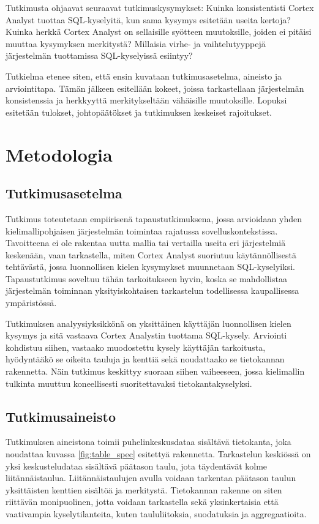 Tutkimusta ohjaavat seuraavat tutkimuskysymykset: Kuinka konsistentisti Cortex Analyst tuottaa SQL-kyselyitä, kun sama kysymys esitetään useita kertoja? Kuinka herkkä Cortex Analyst on sellaisille syötteen muutoksille, joiden ei pitäisi muuttaa kysymyksen merkitystä? Millaisia virhe- ja vaihtelutyyppejä järjestelmän tuottamissa SQL-kyselyissä esiintyy?

Tutkielma etenee siten, että ensin kuvataan tutkimusasetelma, aineisto ja arviointitapa. Tämän jälkeen esitellään kokeet, joissa tarkastellaan järjestelmän konsistenssia ja herkkyyttä merkitykseltään vähäisille muutoksille. Lopuksi esitetään tulokset, johtopäätökset ja tutkimuksen keskeiset rajoitukset.

\section{Metodologia}

\subsection{Tutkimusasetelma}
Tutkimus toteutetaan empiirisenä tapaustutkimuksena, jossa arvioidaan yhden kielimallipohjaisen järjestelmän toimintaa rajatussa sovelluskontekstissa. Tavoitteena ei ole rakentaa uutta mallia tai vertailla useita eri järjestelmiä keskenään, vaan tarkastella, miten Cortex Analyst suoriutuu käytännöllisestä tehtävästä, jossa luonnollisen kielen kysymykset muunnetaan SQL-kyselyiksi. Tapaustutkimus soveltuu tähän tarkoitukseen hyvin, koska se mahdollistaa järjestelmän toiminnan yksityiskohtaisen tarkastelun todellisessa kaupallisessa ympäristössä.

Tutkimuksen analyysiyksikkönä on yksittäinen käyttäjän luonnollisen kielen kysymys ja sitä vastaava Cortex Analystin tuottama SQL-kysely. Arviointi kohdistuu siihen, vastaako muodostettu kysely käyttäjän tarkoitusta, hyödyntääkö se oikeita tauluja ja kenttiä sekä noudattaako se tietokannan rakennetta. Näin tutkimus keskittyy suoraan siihen vaiheeseen, jossa kielimallin tulkinta muuttuu koneellisesti suoritettavaksi tietokantakyselyksi.

\subsection{Tutkimusaineisto}
Tutkimuksen aineistona toimii puhelinkeskusdataa sisältävä tietokanta, joka noudattaa kuvassa \ref{fig:table_spec} esitettyä rakennetta. Tarkastelun keskiössä on yksi keskusteludataa sisältävä päätason taulu, jota täydentävät kolme liitännäistaulua. Liitännäistaulujen avulla voidaan tarkentaa päätason taulun yksittäisten kenttien sisältöä ja merkitystä. Tietokannan rakenne on siten riittävän monipuolinen, jotta voidaan tarkastella sekä yksinkertaisia että vaativampia kyselytilanteita, kuten taululiitoksia, suodatuksia ja aggregaatioita.

